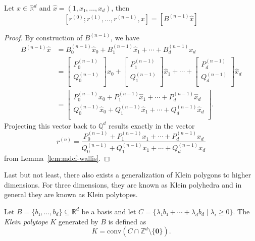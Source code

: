 \begin{lemma}
  \label{lem:mdcf-wallis'}
  Let $x ∈ ℝ^d$ and $\hat x = (1, x₁, …, x_d)$, then
  \[
    [r^{(0)}; r^{(1)}, …, r^{(n-1)}, x] = [B^{(n-1)} \hat x]
  \]
\end{lemma}

\begin{proof}
  By construction of $B^{(n-1)}$, we have
  \begin{align*}
    B^{(n-1)} \hat x
    & = B_0^{(n-1)} \hat x_0 + B_1^{(n-1)} \hat x_1 + ⋯ + B_d^{(n-1)} x_d \\
    & =
    \begin{bmatrix}
      P_0^{(n-1)} \\
      Q_0^{(n-1)} \\
    \end{bmatrix} \hat x_0
    + \begin{bmatrix}
      P_1^{(n-1)} \\
      Q_1^{(n-1)} \\
    \end{bmatrix} \hat x_1
    + ⋯ + \begin{bmatrix}
      P_d^{(n-1)} \\
      Q_d^{(n-1)} \\
    \end{bmatrix} \hat x_d \\
    & = \begin{bmatrix}
      P_0^{(n-1)} \hat x_0 + P_1^{(n-1)} \hat x_1 + ⋯ + P_d^{(n-1)} \hat x_d \\
      Q_0^{(n-1)} \hat x_0 + Q_1^{(n-1)} \hat x_1 + ⋯ + Q_d^{(n-1)} \hat x_d \\
    \end{bmatrix}.
  \end{align*}
  Projecting this vector back to $ℚ^d$ results exactly in the vector
  \[
    r^{(n)} = \frac{P_0^{(n-1)} + P_1^{(n-1)} x_1 + ⋯ + P_d^{(n-1)} x_d}{Q_0^{(n-1)} + Q_1^{(n-1)} x_1 + ⋯ + Q_d^{(n-1)} x_d}
  \]
  from
  Lemma~\ref{lem:mdcf-wallis}.
\end{proof}

\iffalse
Last but not least,
there also exists a generalization of Klein polygons to higher dimensions.
For three dimensions, they are known as Klein polyhedra
and in general they are known as Klein polytopes.

\begin{definition}
  Let $B = \{b₁, …, b_d\} ⊆ ℝ^d$ be a basis and let $C = \{ λ₁ b₁ + ⋯ + λ_d b_d \mid λ_i ≥ 0 \}$.
  The \emph{Klein polytope} $K$ generated by $B$ is defined as
  \[
    K = \mathrm{conv}(C ∩ ℤ^d \setminus \{\symbf 0\}).
  \]
\end{definition}


